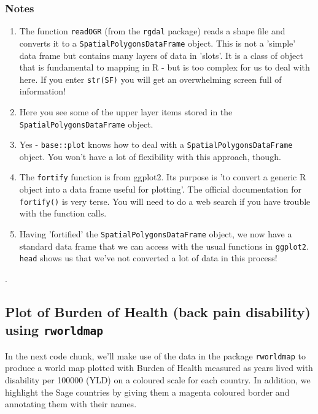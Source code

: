 \documentclass[titlepage]{book}\usepackage{knitr}
\begin{document}
\subsubsection{Notes}
\begin{enumerate}




\item{The function \texttt{readOGR} (from the \texttt{rgdal} package) reads a shape file and converts it to a \texttt{SpatialPolygonsDataFrame} object. This is not a 'simple' data frame but contains many layers of data in 'slots'. It is a class of object that is fundamental to mapping in R - but is too complex for us to deal with here. If you enter \texttt{str(SF)} you will get an overwhelming  screen full of information!}
\item {Here you see some of the upper layer items stored in the \texttt{SpatialPolygonsDataFrame} object.}




\item {Yes - \texttt{base::plot} knows how to deal with a \texttt{SpatialPolygonsDataFrame} object. You won't have a lot of flexibility with this approach, though.}
\item {The \texttt{fortify} function is from ggplot2. Its purpose is 'to convert a generic R object into  a data frame useful for plotting'. The official documentation for \texttt{fortify()} is very terse. You will need to do a web search if you have trouble with the function calls.}
\item {Having 'fortified' the \texttt{SpatialPolygonsDataFrame} object, we now have a standard data frame that we can access with the usual functions in \texttt{ggplot2}. \texttt{head} shows us that we've not converted a lot of data in this process!}
\end{enumerate}.



\subsection{Plot of Burden of Health (back pain disability) using \texttt {rworldmap}}

In the next code chunk, we'll make use of the data in the package \texttt {rworldmap} to produce a world map plotted with Burden of Health measured as years lived with disability per 100000 (YLD) on a coloured scale for each country. In addition, we highlight the Sage countries by giving them a magenta coloured border and annotating them with their names.
\end{document}
